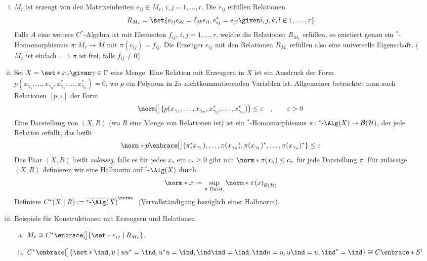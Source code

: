 \begin{beispiel}[{name=[Relationen und Erzeuger]}]
	\leavevmode
	\begin{enumerate}[(i)]
		\item $M_r$ ist erzeugt von den Matrixeinheiten $e_{ij} \in M_r$, $i,j=1,\ldots ,r$.
		Die $e_{ij}$ erfüllen Relationen 
		\[
			R_{M_r}=\set{e_{ij} e_{kl}=\delta_{jk} e_{il}, e_{ij}^*= e_{ji} \given  i,j,k,l \in 1,\ldots ,r}
		\]
		Falls $A$ eine weitere $C^*$-Algebra ist mit Elementen  $f_{ij}$, $i,j=1,\ldots,r$, welche die Relationen $R_{M_r}$ erfüllen, so existiert genau ein $^*$-Homomorphismus $\pi \colon M_r \to M$ mit $\pi(e_{ij})=f_{ij}$.
		Die Erzeuger $e_{ij}$ mit den Relationen $R_{M_r}$ erfüllen also eine universelle Eigenschaft.
		($M_r$ ist einfach $\implies \pi$ ist frei, falls $f_{ij}\neq 0$)
		\item Sei $X=\set*{x_\gamma \given \gamma \in \Gamma}$ eine Menge.
		Eine Relation mit Erzeugern in $X$ ist ein Ausdruck der Form $p(x_{\gamma_1}, \ldots ,x_{\gamma_n}, x_{\gamma_1}^*, \ldots , x_{\gamma_n}^*)=0$, wo $p$ ein Polynom in $2n$ nichtkommutierenden Variablen ist.
		Allgemeiner betrachtet man auch Relationen $[p,\varepsilon]$ der Form 
		\[
			\norm[\big]{p(x_{\gamma_1},\ldots ,x_{\gamma_n},x_{\gamma_1}^*,\ldots ,x_{\gamma_n}^*)} \le \varepsilon \quad , \qquad \varepsilon>0
		\]
		Eine Darstellung von $(X,R)$ (wo $R$ eine Menge von Relationen ist) ist ein $^*$-Homomorphismus $\pi \colon ^*\text{-}\Alg(X) \to \mathcal{B}(\mathcal{H})$, der jede Relation erfüllt, das heißt 
		\[
			\norm*{p\enbrace[\big]{\pi(x_{\gamma_1}) , \ldots , \pi(x_{\gamma_n}), \pi(x_{\gamma_1})^* ,\ldots , \pi(x_{\gamma_n})^*}} \le \varepsilon
		\]
		Das Paar $(X,R)$ heißt \emph{zulässig}, falls es für jedes $x_\gamma$ ein $c_\gamma \ge 0$ gibt mit $\norm*{\pi(x_\gamma)} \le c_\gamma$ für jede Darstellung $\pi$.
		Für zulässige $(X,R)$ definieren wir eine Halbnorm auf $^*$-$\Alg(X)$ durch 
		\[
			\norm*{x} := \sup_{\pi \text{ Darst.}} \norm*{\pi(x)}_{\mathcal{B}(\mathcal{H})}
		\]
		Definiere $C^*(X\mid R) := \overline{^*\text{-}\Alg(X)}^{\norm*{\cdot}}$ (Vervollständigung bezüglich einer Halbnorm).
		\item Beispiele für Konstruktionen mit Erzeugern und Relationen:
		\begin{enumerate}[a)]
			\item $M_r \cong C^* \enbrace[\big]{\set*{e_{ij}} \mid R_{M_r}}$.
			\item $C^* \enbrace[\big]{\set*{\ind,u} \mid uu^*=\ind, u^*u=\ind, \ind \ind=\ind, \ind u=u, u \ind=u,\ind^*=\ind} \cong C \enbrace*{S^1}$

\end{enumerate}
\end{enumerate}
\end{beispiel}
